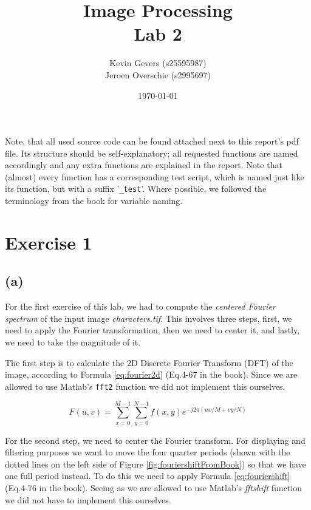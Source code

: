 \documentclass{article}
\title{Image Processing\\
    Lab 2}
\author{Kevin Gevers (s25595987) \\ Jeroen Overschie (s2995697)}
\date{\today}
\begin{document}
\maketitle

Note, that all used source code can be found attached next to this report's pdf file. Its structure should be self-explanatory; all requested functions are named accordingly and any extra functions are explained in the report. Note that (almost) every function has a corresponding test script, which is named just like its function, but with a suffix '\texttt{\_test}'. Where possible, we followed the terminology from the book \citep{gonzalez2008digital} for variable naming.

\section*{Exercise 1}
\subsection*{(a)}
For the first exercise of this lab, we had to compute the \textit{centered Fourier spectrum} of the input image \textit{characters.tif}. This involves three steps, first, we need to apply the Fourier transformation, then we need to center it, and lastly, we need to take the magnitude of it. 

The first step is to calculate the 2D Discrete Fourier Transform (DFT) of the image, according to Formula \ref{eq:fourier2d} (Eq.4-67 in the book). Since we are allowed to use Matlab's \texttt{fft2} function we did not implement this ourselves.

\begin{equation}\label{eq:fourier2d}
    F(u, v)=\sum_{x=0}^{M-1} \sum_{y=0}^{N-1} f(x, y) e^{-j 2 \pi(u x / M+v y / N)}
\end{equation}

For the second step, we need to center the Fourier transform. For displaying and filtering purposes we want to move the four quarter periods (shown with the dotted lines on the left side of Figure \ref{fig:fouriershiftFromBook}) so that we have one full period instead. To do this we need to apply Formula \ref{eq:fouriershift} (Eq.4-76 in the book). Seeing as we are allowed to use Matlab's \textit{fftshift} function we did not have to implement this ourselves.
\end{document}
